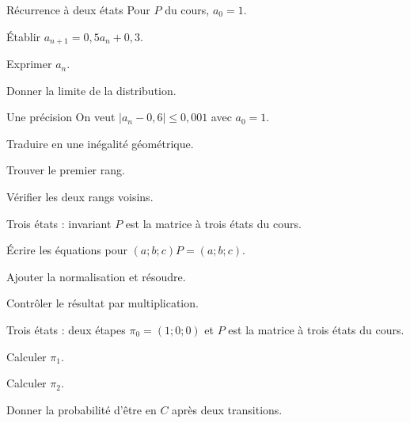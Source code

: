 \clearpage
{}
\begingroup\renewcommand{\otBesoinPlace}[1]{}\begin{minipage}{\linewidth}
\begin{exercice}[2]{Récurrence à deux états}
Pour $P$ du cours, $a_0=1$.
\begin{questions}
\item Établir $a_{n+1}=0{,}5a_n+0{,}3$.
\item Exprimer $a_n$.
\item Donner la limite de la distribution.
\end{questions}
\end{exercice}
\begin{exercice}[2]{Une précision}
On veut $|a_n-0{,}6|\leq0{,}001$ avec $a_0=1$.
\begin{questions}
\item Traduire en une inégalité géométrique.
\item Trouver le premier rang.
\item Vérifier les deux rangs voisins.
\end{questions}
\end{exercice}
\begin{exercice}[2]{Trois états : invariant}
$P$ est la matrice à trois états du cours.
\begin{questions}
\item Écrire les équations pour $(a;b;c)P=(a;b;c)$.
\item Ajouter la normalisation et résoudre.
\item Contrôler le résultat par multiplication.
\end{questions}
\end{exercice}
\begin{exercice}[2]{Trois états : deux étapes}
$\pi_0=(1;0;0)$ et $P$ est la matrice à trois états du cours.
\begin{questions}
\item Calculer $\pi_1$.
\item Calculer $\pi_2$.
\item Donner la probabilité d’être en $C$ après deux transitions.
\end{questions}
\end{exercice}
\end{minipage}\endgroup
\clearpage
{}
